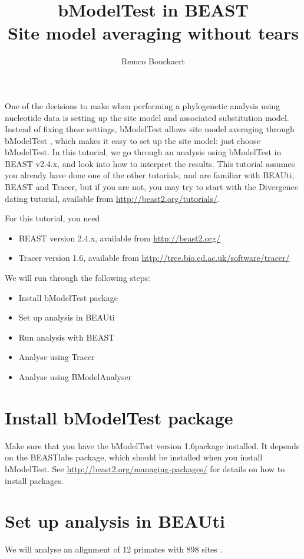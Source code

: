 \documentclass{article}
\title{bModelTest in BEAST {\BEASTVersion}\\
Site model averaging without tears}
\author{Remco Bouckaert}
\newcommand{\BEASTVersion}{2.4.x}
\newcommand{\TracerVersion}{1.6}
\newcommand{\bModelTestVersion}{1.6}
\begin{document}
\maketitle

One of the decisions to make when performing a phylogenetic analysis using nucleotide data is setting up the site model and associated substitution model.
Instead of fixing these settings, bModelTest allows site model averaging through bModelTest \cite{bModelTest}, which makes it easy to set up the site model: just choose bModelTest.
In this tutorial, we go through an analysis using bModelTest in BEAST v\BEASTVersion \cite{beast}, and look into how to interpret the results.
This tutorial assumes you already have done one of the other tutorials, and are familiar with BEAUti, BEAST and Tracer, but if you are not, you may try to start with the Divergence dating tutorial, available from \url{http://beast2.org/tutorials/}.

For this tutorial, you need
\begin{itemize}
\item BEAST version \BEASTVersion, available from \url{http://beast2.org/}
\item Tracer version \TracerVersion, available from \url{http://tree.bio.ed.ac.uk/software/tracer/}
\end{itemize}

We will run through the following steps:
\begin{itemize}
\item{Install bModelTest package}
\item{Set up analysis in BEAUti}
\item{Run analysis with BEAST}
\item{Analyse using Tracer}
\item{Analyse using BModelAnalyser}
\end{itemize}

\section*{Install bModelTest package}
Make sure that you have the bModelTest version \bModelTestVersion package installed. It depends on the BEASTlabs package, which should be installed when you install bModelTest.
See \url{http://beast2.org/managing-packages/} for details on how to install packages.

\section*{Set up analysis in BEAUti}
We will analyse an alignment of 12 primates  with 898 sites \cite{hayasaka1988molecular}. 
\end{document}
